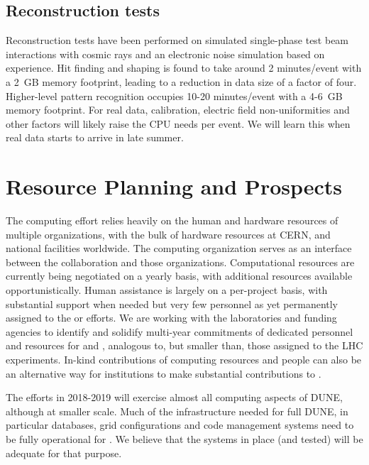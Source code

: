 \subsection{Reconstruction tests}
Reconstruction tests have been performed on simulated  single-phase  test beam interactions with cosmic rays and an electronic noise simulation based on  experience.  Hit finding and shaping is found to take around 2 minutes/event with a 2~GB memory footprint, leading to a reduction in data size of a factor of four.  Higher-level pattern recognition occupies 10-20 minutes/event with a 4-6~GB memory footprint.  For real data, calibration, electric field non-uniformities and other factors will likely raise the CPU needs per event. We will learn this when real data starts to arrive in late summer. 


\section{Resource Planning and Prospects}



The   computing effort  relies heavily on the human and hardware resources of  multiple organizations,  with the bulk of hardware resources at CERN, and national facilities worldwide.  The    computing organization serves as an interface between the collaboration and those organizations.  Computational resources are currently being negotiated on a yearly basis, with additional resources available opportunistically. Human assistance is largely on a per-project  basis, with substantial support when needed but very few personnel as yet permanently assigned to the   or  efforts.  We are working with the laboratories and funding agencies to identify and solidify multi-year commitments of dedicated personnel and resources for  and , analogous to, but smaller than, those assigned to the LHC experiments.   In-kind contributions of computing resources and people can also  be an alternative way for institutions to make substantial contributions to .

The  efforts in 2018-2019 will exercise almost all computing aspects of DUNE, although at smaller scale.  Much of the infrastructure needed for full DUNE, in particular  databases, grid configurations and code management systems need to be fully operational  for .   We believe that the systems in place (and tested) will be adequate for that purpose.

